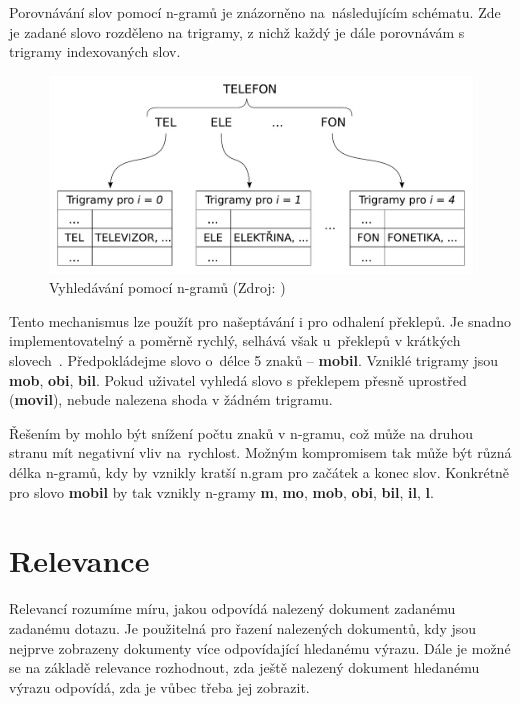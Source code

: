 \documentclass[FM,DP]{tulthesis}
\begin{document}
Porovnávání slov pomocí n-gramů je znázorněno na~následujícím schématu. Zde je zadané slovo
rozděleno na trigramy, z nichž každý je dále porovnávám s trigramy indexovaných slov.

\begin{figure}[h]
\center
\includegraphics[width=\textwidth]{n-gram.pdf}
\caption[Vyhledávání pomocí n-gramů]{Vyhledávání pomocí n-gramů (Zdroj: \cite{n-gram})}
\label{n-gram}
\end{figure}

Tento mechanismus lze použít pro našeptávání i pro odhalení překlepů. Je snadno implementovatelný
a poměrně rychlý, selhává však u~překlepů v krátkých slovech~\cite{n-gram}. Předpokládejme slovo 
o~délce 5 znaků -- \textbf{mobil}. Vzniklé trigramy jsou \textbf{mob}, \textbf{obi}, \textbf{bil}.
Pokud uživatel vyhledá slovo s překlepem přesně uprostřed (\textbf{movil}), nebude nalezena
shoda v žádném trigramu. 

Řešením by mohlo být snížení počtu znaků v n-gramu, což může na druhou stranu mít negativní 
vliv na~rychlost. Možným kompromisem tak může být různá délka n-gramů, kdy by vznikly kratší
n.gram pro začátek a konec slov. Konkrétně pro slovo \textbf{mobil} by tak vznikly n-gramy 
\textbf{m}, \textbf{mo}, \textbf{mob}, \textbf{obi}, \textbf{bil}, \textbf{il}, \textbf{l}.

\section{Relevance}

Relevancí rozumíme míru, jakou odpovídá nalezený dokument zadanému zadanému dotazu.
Je použitelná pro řazení nalezených dokumentů, kdy jsou nejprve zobrazeny dokumenty
více odpovídající hledanému výrazu. Dále je možné se na základě relevance rozhodnout, 
zda ještě nalezený dokument hledanému výrazu odpovídá, zda je vůbec třeba jej zobrazit.
\end{document}
